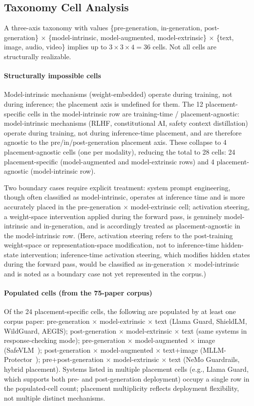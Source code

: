 \subsection{Taxonomy Cell Analysis}

A three-axis taxonomy with values \{pre-generation, in-generation, post-generation\} $\times$ \{model-intrinsic, model-augmented, model-extrinsic\} $\times$ \{text, image, audio, video\} implies up to $3 \times 3 \times 4 = 36$ cells.
Not all cells are structurally realizable.

\paragraph{Structurally impossible cells}
Model-intrinsic mechanisms (weight-embedded) operate during training, not during inference; the placement axis is undefined for them.
The 12 placement-specific cells in the model-intrinsic row are training-time / placement-agnostic: model-intrinsic mechanisms (RLHF, constitutional AI, safety context distillation) operate during training, not during inference-time placement, and are therefore agnostic to the pre/in/post-generation placement axis.
These collapse to 4 placement-agnostic cells (one per modality), reducing the total to 28 cells: 24 placement-specific (model-augmented and model-extrinsic rows) and 4 placement-agnostic (model-intrinsic row).

Two boundary cases require explicit treatment: system prompt engineering, though often classified as model-intrinsic, operates at inference time and is more accurately placed in the pre-generation $\times$ model-extrinsic cell; activation steering, a weight-space intervention applied during the forward pass, is genuinely model-intrinsic and in-generation, and is accordingly treated as placement-agnostic in the model-intrinsic row.
(Here, activation steering refers to the post-training weight-space or representation-space modification, not to inference-time hidden-state intervention; inference-time activation steering, which modifies hidden states during the forward pass, would be classified as in-generation $\times$ model-intrinsic and is noted as a boundary case not yet represented in the corpus.)

\paragraph{Populated cells (from the 75-paper corpus)}
Of the 24 placement-specific cells, the following are populated by at least one corpus paper:
pre-generation $\times$ model-extrinsic $\times$ text (Llama Guard, ShieldLM, WildGuard, AEGIS);
post-generation $\times$ model-extrinsic $\times$ text (same systems in response-checking mode);
pre-generation $\times$ model-augmented $\times$ image (SafeVLM~\cite{oh2024safevlm});
post-generation $\times$ model-augmented $\times$ text+image (MLLM-Protector~\cite{pi2024mllm});
pre+post-generation $\times$ model-extrinsic $\times$ text (NeMo Guardrails, hybrid placement).
Systems listed in multiple placement cells (e.g., Llama Guard, which supports both pre- and post-generation deployment) occupy a single row in the populated-cell count; placement multiplicity reflects deployment flexibility, not multiple distinct mechanisms.

